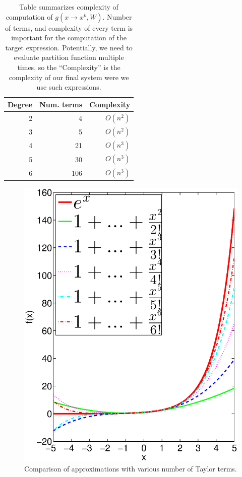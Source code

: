 \begin{table}
\tiny
\centering
\begin{tabular}{rrr}
\hline
Degree & Num. terms & Complexity \\
\hline
2 & 4 & $O(n^2)$\\
3 & 5 & $O(n^2)$\\
4 & 21 & $O(n^3)$\\
5 & 30 & $O(n^3)$\\
6 & 106 & $O(n^3)$\\
\hline
\end{tabular}
\caption{Table summarizes complexity of computation of $g(x \rightarrow x^k, W)$. 
Number of terms, and complexity of every term is important for the computation of the target expression.
Potentially, we need to evaluate partition function multiple times, so the ``Complexity''
is the complexity of our final system were we use such expressions.} 
\label{eval}
\end{table}

\begin{figure}[h]
\centering
\includegraphics[scale=0.2]{img/approximations.eps}
\caption{Comparison of approximations with various number of Taylor terms.}
\label{approximations}
\end{figure}



